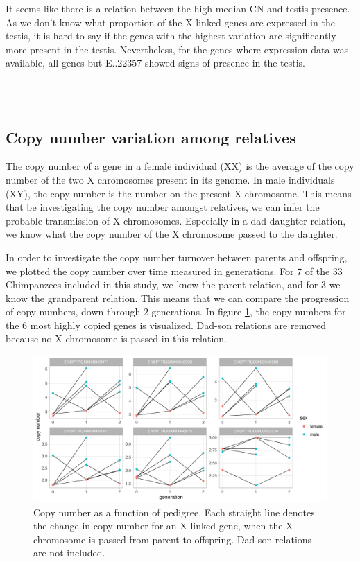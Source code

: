 \noindent It seems like there is a relation between the high median CN and testis presence. As we don't know what proportion of the X-linked genes are expressed in the testis, it is hard to say if the genes with the highest variation are significantly more present in the testis. Nevertheless, for the genes where expression data was available, all genes but E..22357 showed signs of presence in the testis.


\\
\\
\subsection*{Copy number variation among relatives}
The copy number of a gene in a female individual (XX) is the average of the copy number of the two X chromosomes present in its genome. In male individuals (XY), the copy number is the number on the present X chromosome. This means that be investigating the copy number amongst relatives, we can infer the probable transmission of X chromosomes. Especially in a dad-daughter relation, we know what the copy number of the X chromosome passed to the daughter.

In order to investigate the copy number turnover between parents and offspring, we plotted the copy number over time measured in generations. For 7 of the 33 Chimpanzees included in this study, we know the parent relation, and for 3 we know the grandparent relation. This means that we can compare the progression of copy numbers, down through 2 generations. In figure \ref{fig:pedigree_CN}, the copy numbers for the 6 most highly copied genes is visualized. Dad-son relations are removed because no X chromosome is passed in this relation.

\begin{figure}[h] 
  \centering
  \includegraphics[scale=0.78]{figures/fig_pedigree_CN_3.pdf}
  \caption{Copy number as a function of pedigree. Each straight line denotes the change in copy number for an X-linked gene, when the X chromosome is passed from parent to offspring. Dad-son relations are not included.}
  \label{fig:pedigree_CN}
\end{figure}


